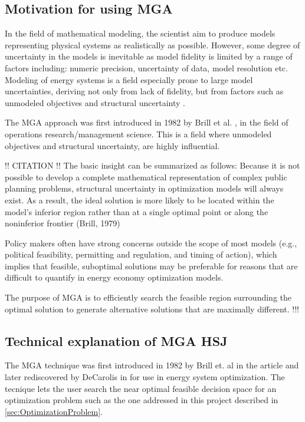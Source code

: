 \subsection{Motivation for using MGA}

In the field of mathematical modeling, the scientist aim to produce models representing physical systems as realistically as possible. However, some degree of uncertainty in the models is inevitable as model fidelity is limited by a range of factors including: numeric precision, uncertainty of data, model resolution etc. Modeling of energy systems is a field especially prone to large model uncertainties, deriving not only from lack of fidelity, but from factors such as unmodeled objectives and structural uncertainty \cite{DeCarolis_MGA}. 

The MGA approach was first introduced in 1982 by Brill et al. \cite{Brill_MGA_1982}, in the field of operations research/management science. This is a field where unmodeled objectives and structural uncertainty, are highly influential. 

!! CITATION !!
The basic insight can be
summarized as follows: Because it is not possible to develop a complete
mathematical representation of complex public planning problems,
structural uncertainty in optimization models will always exist. As a
result, the ideal solution is more likely to be located within the model's
inferior region rather than at a single optimal point or along the noninferior frontier (Brill, 1979)

Policy makers often have strong concerns outside the scope of most models
(e.g., political feasibility, permitting and regulation, and timing of
action), which implies that feasible, suboptimal solutions may be
preferable for reasons that are difficult to quantify in energy economy
optimization models.

The purpose of MGA is to efficiently search the feasible
region surrounding the optimal solution to generate alternative
solutions that are maximally different. !!!

\subsection{Technical explanation of MGA HSJ}

The MGA technique was first introduced in 1982 by Brill et. al in the article \cite{Brill_MGA_1982} and later rediscovered by DeCarolis in \cite{DeCarolis_MGA} for use in energy system optimization. The tecnique lets the user search the near optimal feasible decision space for an optimization problem such as the one addressed in this project described in \ref{sec:OptimizationProblem}. 

